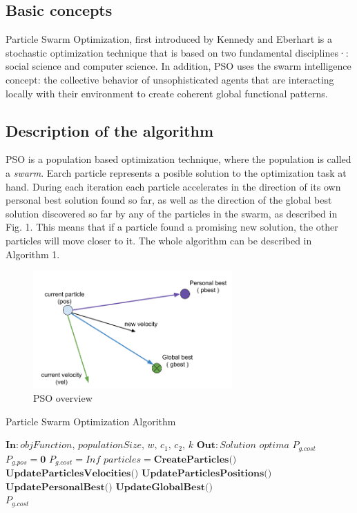\documentclass[journal,onecolumn]{IEEEtran}
\begin{document}
\subsection{ \textbf{Basic concepts} }
Particle Swarm Optimization, first introduced by Kennedy and Eberhart \cite{Kennedy1995} is a stochastic optimization technique that is based on two fundamental disciplines·\cite{delValle2008}: social science and computer science. In addition, PSO uses the swarm intelligence concept: the collective behavior of unsophisticated agents that are interacting locally with their environment to create coherent global functional patterns.

\subsection{ \textbf{Description of the algorithm} }
PSO is a population based optimization technique, where the population is called a \textit{swarm}. Earch particle represents a posible solution to the optimization task at hand. During each iteration each particle accelerates in the direction of its own personal best solution found so far, as well as the direction of the global best solution discovered so far by any of the particles in the swarm, as described in Fig. 1. This means that if a particle found a promising new solution, the other particles will move closer to it. The whole algorithm can be described in Algorithm 1.
\\
\begin{figure}[H]
\centering
\captionsetup{justification=centering}
\includegraphics[width=3.0in]{_img/img_PSO_overview.png}
\caption{PSO overview}
\end{figure}

\begin{algorithm}
    \caption{Particle Swarm Optimization Algorithm}\label{alg:PSOpseudocode}
    \begin{algorithmic}[1]
        \State $\textbf{In}: \textit{objFunction, populationSize, w, $c_{1}$, $c_{2}$, k}$
        \State $\textbf{Out}: \textit{Solution optima } P_{g.cost}$
        \State $P_{g.pos} = \textbf{0}$
        \State $P_{g.cost} = Inf$
        \State $particles = \textbf{CreateParticles()}$
                \State $\textbf{UpdateParticlesVelocities()}$
                \State $\textbf{UpdateParticlesPositions()}$
                \State $\textbf{UpdatePersonalBest()}$
                \State $\textbf{UpdateGlobalBest()}$
            \EndFor
        \EndWhile
        \\
        \Return $P_{g.cost}$
    \end{algorithmic}
\end{algorithm}
\end{document}
